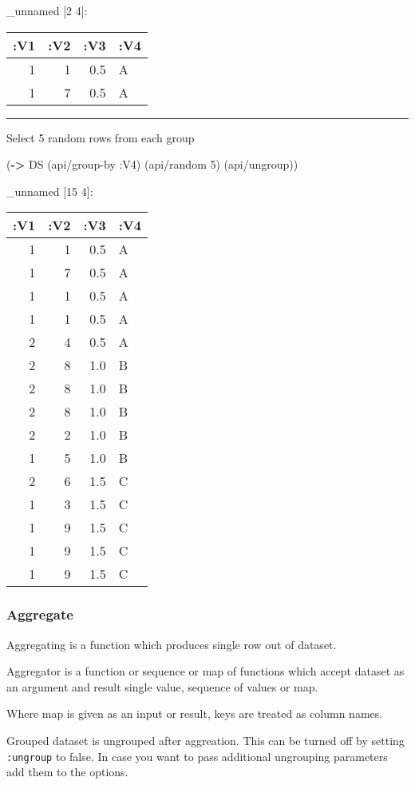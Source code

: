 \documentclass[]{article}
\newenvironment{Shaded}{\begin{snugshade}}{\end{snugshade}}
\newcommand{\KeywordTok}[1]{\textcolor[rgb]{0.13,0.29,0.53}{\textbf{#1}}}
\newcommand{\DecValTok}[1]{\textcolor[rgb]{0.00,0.00,0.81}{#1}}
\newcommand{\AttributeTok}[1]{\textcolor[rgb]{0.77,0.63,0.00}{#1}}
\newcommand{\NormalTok}[1]{#1}
\begin{document}
\_unnamed {[}2 4{]}:

\begin{longtable}[]{@{}rrrl@{}}
\toprule
:V1 & :V2 & :V3 & :V4\tabularnewline
\midrule
\endhead
1 & 1 & 0.5 & A\tabularnewline
1 & 7 & 0.5 & A\tabularnewline
\bottomrule
\end{longtable}

\begin{center}\rule{0.5\linewidth}{0.5pt}\end{center}

Select 5 random rows from each group

\begin{Shaded}
\begin{Highlighting}[]
\NormalTok{(}\KeywordTok{->}\NormalTok{ DS}
\NormalTok{    (api/group-by }\AttributeTok{:V4}\NormalTok{)}
\NormalTok{    (api/random }\DecValTok{5}\NormalTok{)}
\NormalTok{    (api/ungroup))}
\end{Highlighting}
\end{Shaded}

\_unnamed {[}15 4{]}:

\begin{longtable}[]{@{}rrrl@{}}
\toprule
:V1 & :V2 & :V3 & :V4\tabularnewline
\midrule
\endhead
1 & 1 & 0.5 & A\tabularnewline
1 & 7 & 0.5 & A\tabularnewline
1 & 1 & 0.5 & A\tabularnewline
1 & 1 & 0.5 & A\tabularnewline
2 & 4 & 0.5 & A\tabularnewline
2 & 8 & 1.0 & B\tabularnewline
2 & 8 & 1.0 & B\tabularnewline
2 & 8 & 1.0 & B\tabularnewline
2 & 2 & 1.0 & B\tabularnewline
1 & 5 & 1.0 & B\tabularnewline
2 & 6 & 1.5 & C\tabularnewline
1 & 3 & 1.5 & C\tabularnewline
1 & 9 & 1.5 & C\tabularnewline
1 & 9 & 1.5 & C\tabularnewline
1 & 9 & 1.5 & C\tabularnewline
\bottomrule
\end{longtable}

\subsubsection{Aggregate}\label{aggregate}

Aggregating is a function which produces single row out of dataset.

Aggregator is a function or sequence or map of functions which accept
dataset as an argument and result single value, sequence of values or
map.

Where map is given as an input or result, keys are treated as column
names.

Grouped dataset is ungrouped after aggreation. This can be turned off by
setting \texttt{:ungroup} to false. In case you want to pass additional
ungrouping parameters add them to the options.
\end{document}
